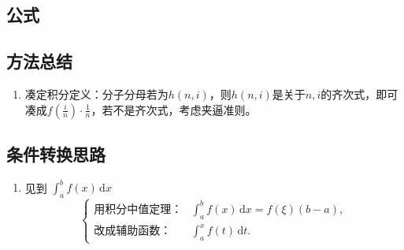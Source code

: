 \documentclass[a4paper,12pt]{article}
\begin{document}
    \begin{enumerate}

    \end{enumerate}

    \subsection{公式}

    \begin{enumerate}

    \end{enumerate}

    \subsection{方法总结}

    \begin{enumerate}
        \item 凑定积分定义：分子分母若为$h(n, i)$，则$h(n, i)$是关于$n, i$的齐次式，即可凑成$f(\displaystyle\frac{i}{n})\cdot \displaystyle\frac{1}{n}$，若不是齐次式，考虑夹逼准则。
    \end{enumerate}

    \subsection{条件转换思路}

    \begin{enumerate}
        \item 见到 $\int_a^b f(x)\,\mathrm{d}x$
        \[
            \begin{cases}
                \text{用积分中值定理：}
                & \displaystyle \int_a^b f(x)\,\mathrm{d}x = f(\xi)(b-a), \\[6pt]
                \text{改成辅助函数：}
                & \displaystyle \int_a^x f(t)\,\mathrm{d}t.
            \end{cases}
        \]
    \end{enumerate}
\end{document}

